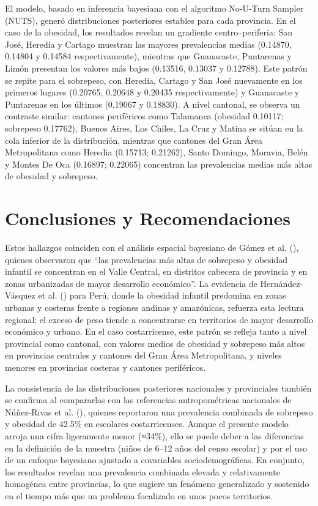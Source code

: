 \documentclass[
]{article}
\begin{document}
El modelo, basado en inferencia bayesiana con el algoritmo No-U-Turn
Sampler (NUTS), generó distribuciones posteriores estables para cada
provincia. En el caso de la obesidad, los resultados revelan un
gradiente centro--periferia: San José, Heredia y Cartago muestran las
mayores prevalencias medias (0.14870, 0.14804 y 0.14584
respectivamente), mientras que Guanacaste, Puntarenas y Limón presentan
los valores más bajos (0.13516, 0.13037 y 0.12788). Este patrón se
repite para el sobrepeso, con Heredia, Cartago y San José nuevamente en
los primeros lugares (0.20765, 0.20648 y 0.20435 respectivamente) y
Guanacaste y Puntarenas en los últimos (0.19067 y 0.18830). A nivel
cantonal, se observa un contraste similar: cantones periféricos como
Talamanca (obesidad 0.10117; sobrepeso 0.17762), Buenos Aires, Los
Chiles, La Cruz y Matina se sitúan en la cola inferior de la
distribución, mientras que cantones del Gran Área Metropolitana como
Heredia (0.15713; 0.21262), Santo Domingo, Moravia, Belén y Montes De
Oca (0.16897; 0.22065) concentran las prevalencias medias más altas de
obesidad y sobrepeso.

\section{Conclusiones y
Recomendaciones}\label{conclusiones-y-recomendaciones}

Estos hallazgos coinciden con el análisis espacial bayesiano de Gómez et
al. (), quienes observaron que ``las
prevalencias más altas de sobrepeso y obesidad infantil se concentran en
el Valle Central, en distritos cabecera de provincia y en zonas
urbanizadas de mayor desarrollo económico''. La evidencia de
Hernández-Vásquez et al. () para Perú,
donde la obesidad infantil predomina en zonas urbanas y costeras frente
a regiones andinas y amazónicas, refuerza esta lectura regional: el
exceso de peso tiende a concentrarse en territorios de mayor desarrollo
económico y urbano. En el caso costarricense, este patrón se refleja
tanto a nivel provincial como cantonal, con valores medios de obesidad y
sobrepeso más altos en provincias centrales y cantones del Gran Área
Metropolitana, y niveles menores en provincias costeras y cantones
periféricos.

La consistencia de las distribuciones posteriores nacionales y
provinciales también se confirma al compararlas con las referencias
antropométricas nacionales de Núñez-Rivas et al.
(), quienes reportaron una prevalencia
combinada de sobrepeso y obesidad de 42.5\% en escolares costarricenses.
Aunque el presente modelo arroja una cifra ligeramente menor (≈34\%),
ello se puede deber a las diferencias en la definición de la muestra
(niños de 6--12 años del censo escolar) y por el uso de un enfoque
bayesiano ajustado a covariables sociodemográficas. En conjunto, los
resultados revelan una prevalencia combinada elevada y relativamente
homogénea entre provincias, lo que sugiere un fenómeno generalizado y
sostenido en el tiempo más que un problema focalizado en unos pocos
territorios.
\end{document}
